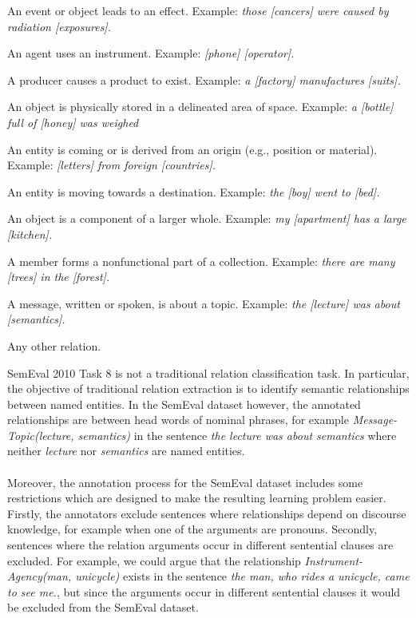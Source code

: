 \begin{description}[labelindent=4em,leftmargin=4em]
	\item [Cause-Effect] An event or object leads to an
effect. Example: \emph{those [cancers] were caused
by radiation [exposures].}
	\item [Instrument-Agency] An agent uses an instrument. Example: \emph{[phone] [operator].}
	\item [Product-Producer] A producer causes a product to exist. Example: \emph{a [factory] manufactures [suits].}
	\item [Content-Container] An object is physically stored in a delineated area of space. Example: \emph{a [bottle] full of [honey] was weighed}
	\item [Entity-Origin] An entity is coming or is derived from an origin (e.g., position or material). Example: \emph{[letters] from foreign [countries].}
	\item [Entity-Destination] An entity is moving towards a destination. Example: \emph{the [boy] went to [bed].}
	\item [Component-Whole] An object is a component of a larger whole. Example: \emph{my [apartment] has a large [kitchen].}
	\item [Member-Collection] A member forms a nonfunctional part of a collection. Example: \emph{there are many [trees] in the [forest].}
	\item [Message-Topic] A message, written or spoken, is about a topic. Example: \emph{the [lecture] was about [semantics].}
	\item [Other] Any other relation.
\end{description}
\noindent
SemEval 2010 Task 8 is not a traditional relation classification task. In particular, the objective of traditional relation extraction is to identify semantic relationships between named entities. In the SemEval dataset however, the annotated relationships are between head words of nominal phrases, for example \textit{Message-Topic(lecture, semantics)} in the sentence \textit{the lecture was about semantics} where neither \textit{lecture} nor \textit{semantics} are named entities.
\\\\
Moreover, the annotation process for the SemEval dataset includes some restrictions which are designed to make the resulting learning problem easier. Firstly, the annotators exclude sentences where relationships depend on discourse knowledge, for example when one of the arguments are pronouns. Secondly, sentences where the relation arguments occur in different sentential clauses are excluded. For example, we could argue that the relationship \textit{Instrument-Agency(man, unicycle)} exists in the sentence \textit{the man, who rides a unicycle, came to see me.}, but since the arguments occur in different sentential clauses it would be excluded from the SemEval dataset.

